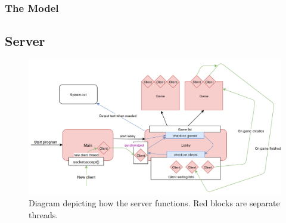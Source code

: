 \documentclass[12pt, letterpaper]{article}
\begin{document}



    \subsubsection{The Model}



    \subsection{Server}

    \begin{figure}[t]
        \begin{center}
            \includegraphics[width=\textwidth]{Server.png}
            \caption{Diagram depicting how the server functions.
            Red blocks are separate threads.}
            \label{fig:serverDiagram}
        \end{center}
    \end{figure}
\end{document}
